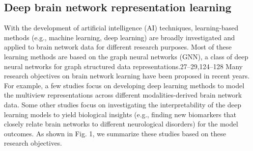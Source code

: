 \subsection{Deep brain network representation learning}
With the development of artificial intelligence (AI) techniques,
learning-based methods (e.g., machine learning, deep learning) are
broadly investigated and applied to brain network data for different
research purposes. Most of these learning methods are based on the graph
neural networks (GNN), a class of deep neural networks for graph structured 
data representations.27–29,124–128 Many research objectives
on brain network learning have been proposed in recent years. For
example, a few studies focus on developing deep learning methods to
model the multiview representations across different modalities-derived
brain network data. Some other studies focus on investigating the
interpretability of the deep learning models to yield biological insights
(e.g., finding new biomarkers that closely relate brain networks to
different neurological disorders) for the model outcomes. As shown in
Fig. 1, we summarize these studies based on these research objectives. \cite{Tang2023}